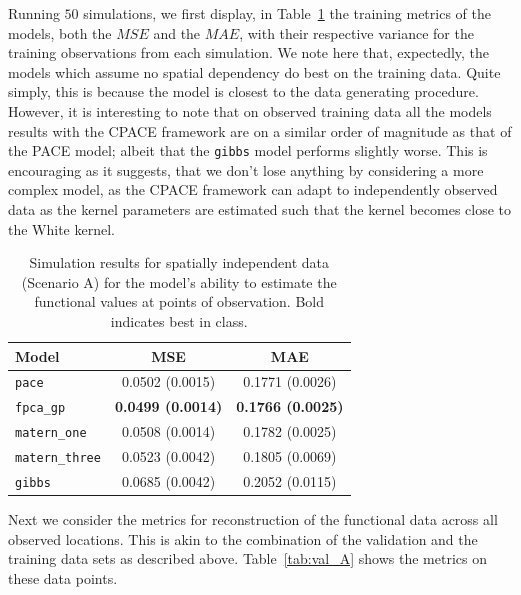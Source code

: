 Running $50$ simulations, we first display, in Table~\ref{tab:train_A} the training metrics of the models, both the $MSE$ and the $MAE$, with their respective variance for the training observations from each simulation. 
We note here that, expectedly, the models which assume no spatial dependency do best on the training data.
Quite simply, this is because the model is closest to the data generating procedure.
However, it is interesting to note that on observed training data all the models results with the CPACE framework are on a similar order of magnitude as that of the PACE model; albeit that the \verb*|gibbs| model performs slightly worse.
This is encouraging as it suggests, that we don't lose anything by considering a more complex model, as the CPACE framework can adapt to independently observed data as the kernel parameters are estimated such that the kernel becomes close to the White kernel.

\begin{table}
	\caption[Simulation results for Scenario A on training data.]{Simulation results for spatially independent data (Scenario A) for the model's ability to estimate the functional values at points of observation. Bold indicates best in class.}
	\centering
	\label{tab:train_A}
	\begin{tabular}{lcc}
		\toprule
		\textbf{Model} & \textbf{MSE} & \textbf{MAE} \\
		\midrule
		\verb*|pace| & 0.0502 (0.0015) & 0.1771 (0.0026) \\
		\verb*|fpca_gp| & \textbf{0.0499 (0.0014)} & \textbf{0.1766 (0.0025)} \\
		\verb*|matern_one| & 0.0508 (0.0014) & 0.1782 (0.0025) \\
		\verb*|matern_three| & 0.0523 (0.0042) & 0.1805 (0.0069) \\
		\verb*|gibbs| & 0.0685 (0.0042) & 0.2052 (0.0115)\\
		\bottomrule
	\end{tabular}
\end{table}

Next we consider the metrics for reconstruction of the functional data across all observed locations.
This is akin to the combination of the validation and the training data sets as described above.
Table~\ref{tab:val_A} shows the metrics on these data points.

